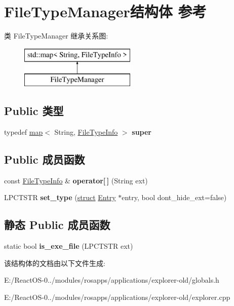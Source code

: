 \hypertarget{struct_file_type_manager}{}\section{File\+Type\+Manager结构体 参考}
\label{struct_file_type_manager}
类 File\+Type\+Manager 继承关系图\+:\begin{figure}[H]
\begin{center}
\leavevmode
\includegraphics[height=2.000000cm]{struct_file_type_manager}
\end{center}
\end{figure}
\subsection*{Public 类型}
\begin{DoxyCompactItemize}
\item 
\mbox{\label{struct_file_type_manager_a223f568f534126169b92dee645397195}} 
typedef \hyperlink{classmap}{map}$<$ String, \hyperlink{struct_file_type_info}{File\+Type\+Info} $>$ {\bfseries super}
\end{DoxyCompactItemize}
\subsection*{Public 成员函数}
\begin{DoxyCompactItemize}
\item 
\mbox{\label{struct_file_type_manager_a75ee104d94714e9455b929e46b2ac71d}} 
const \hyperlink{struct_file_type_info}{File\+Type\+Info} \& {\bfseries operator\mbox{[}$\,$\mbox{]}} (String ext)
\item 
\mbox{\label{struct_file_type_manager_ac5e383bae3f881d4b99f0eb44666646a}} 
L\+P\+C\+T\+S\+TR {\bfseries set\+\_\+type} (\hyperlink{interfacestruct}{struct} \hyperlink{struct_entry}{Entry} $\ast$entry, bool dont\+\_\+hide\+\_\+ext=false)
\end{DoxyCompactItemize}
\subsection*{静态 Public 成员函数}
\begin{DoxyCompactItemize}
\item 
\mbox{\label{struct_file_type_manager_a5214cd69c441263517bc556456d032b9}} 
static bool {\bfseries is\+\_\+exe\+\_\+file} (L\+P\+C\+T\+S\+TR ext)
\end{DoxyCompactItemize}


该结构体的文档由以下文件生成\+:\begin{DoxyCompactItemize}
\item 
E\+:/\+React\+O\+S-\/0../modules/rosapps/applications/explorer-\/old/globals.\+h\item 
E\+:/\+React\+O\+S-\/0../modules/rosapps/applications/explorer-\/old/explorer.\+cpp\end{DoxyCompactItemize}
